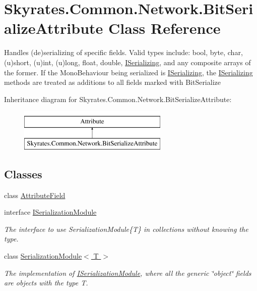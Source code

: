 \hypertarget{class_skyrates_1_1_common_1_1_network_1_1_bit_serialize_attribute}{\section{Skyrates.\-Common.\-Network.\-Bit\-Serialize\-Attribute Class Reference}
\label{class_skyrates_1_1_common_1_1_network_1_1_bit_serialize_attribute}
}


Handles (de)serializing of specific fields. Valid types include\-: bool, byte, char, (u)short, (u)int, (u)long, float, double, \hyperlink{interface_skyrates_1_1_common_1_1_network_1_1_i_serializing}{I\-Serializing}, and any composite arrays of the former. If the Mono\-Behaviour being serialized is \hyperlink{interface_skyrates_1_1_common_1_1_network_1_1_i_serializing}{I\-Serializing}, the \hyperlink{interface_skyrates_1_1_common_1_1_network_1_1_i_serializing}{I\-Serializing} methods are treated as additions to all fields marked with Bit\-Serialize  


Inheritance diagram for Skyrates.\-Common.\-Network.\-Bit\-Serialize\-Attribute\-:\begin{figure}[H]
\begin{center}
\leavevmode
\includegraphics[height=2.000000cm]{class_skyrates_1_1_common_1_1_network_1_1_bit_serialize_attribute}
\end{center}
\end{figure}
\subsection*{Classes}
\begin{DoxyCompactItemize}
\item 
class \hyperlink{class_skyrates_1_1_common_1_1_network_1_1_bit_serialize_attribute_1_1_attribute_field}{Attribute\-Field}
\item 
interface \hyperlink{interface_skyrates_1_1_common_1_1_network_1_1_bit_serialize_attribute_1_1_i_serialization_module}{I\-Serialization\-Module}
\begin{DoxyCompactList}\small\item\em The interface to use Serialization\-Module\{\-T\} in collections without knowing the type. \end{DoxyCompactList}\item 
class \hyperlink{class_skyrates_1_1_common_1_1_network_1_1_bit_serialize_attribute_1_1_serialization_module_3_01_t_01_4}{Serialization\-Module$<$ T $>$}
\begin{DoxyCompactList}\small\item\em The implementation of \hyperlink{interface_skyrates_1_1_common_1_1_network_1_1_bit_serialize_attribute_1_1_i_serialization_module}{I\-Serialization\-Module}, where all the generic \char`\"{}object\char`\"{} fields are objects with the type T. \end{DoxyCompactList}\end{DoxyCompactItemize}
